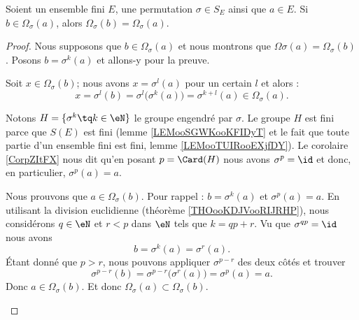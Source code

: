 \begin{lemma}       \label{LEMooMIHGooQfALbc}
	Soient un ensemble fini \( E\), une permutation \( \sigma\in S_E\) ainsi que \( a\in E\). Si \( b\in \Omega_{\sigma}(a)\), alors \( \Omega_{\sigma}(b)=\Omega_{\sigma}(a)\).
\end{lemma}

\begin{proof}
	Nous supposons que \( b\in \Omega_{\sigma}(a)\) et nous montrons que \( \Omega{\sigma}(a)=\Omega_{\sigma}(b)\). Posons \( b=\sigma^k(a)\) et allons-y pour la preuve.
	\begin{subproof}
		Soit \( x\in \Omega_{\sigma}(b)\); nous avons \( x=\sigma^l(a)\) pour un certain \( l\) et alors :
		\begin{equation}
			x=\sigma^l(b)=\sigma^l\big( \sigma^k(a) \big)=\sigma^{k+l}(a)\in \Omega_{\sigma}(a).
		\end{equation}

		Notons \( H=\{ \sigma^k\tq k\in \eN \}\) le groupe engendré par \( \sigma\). Le groupe \( H\) est fini parce que \( S(E)\) est fini (lemme \ref{LEMooSGWKooKFIDyT} et le fait que toute partie d'un ensemble fini est fini, lemme \ref{LEMooTUIRooEXjfDY}). Le corolaire \ref{CorpZItFX} nous dit qu'en posant \( p=\Card(H)\) nous avons \( \sigma^p=\id\) et donc, en particulier, \( \sigma^p(a)=a\).

		Nous prouvons que \( a\in \Omega_{\sigma}(b)\). Pour rappel : \( b=\sigma^k(a)\) et \( \sigma^p(a)=a\). En utilisant la division euclidienne (théorème \ref{THOooKDJVooRIJRHP}), nous considérons \( q\in \eN\) et \( r<p\) dans \( \eN\) tels que \( k=qp+r\). Vu que \( \sigma^{qp}=\id\) nous avons
		\begin{equation}
			b=\sigma^k(a)=\sigma^r(a).
		\end{equation}
		Étant donné que \( p>r\), nous pouvons appliquer \( \sigma^{p-r}\) des deux côtés et trouver
		\begin{equation}
			\sigma^{p-r}(b)=\sigma^{p-r}\big( \sigma^r(a) \big)=\sigma^p(a)=a.
		\end{equation}
		Donc \( a\in\Omega_{\sigma}(b)\). Et donc \( \Omega_{\sigma}(a)\subset\Omega_{\sigma}(b)\).
	\end{subproof}
\end{proof}


